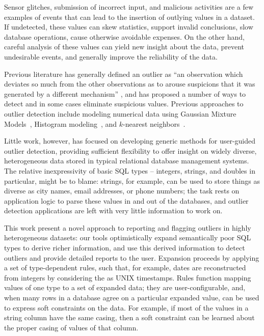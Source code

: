 
Sensor glitches, submission of incorrect input, and malicious activities are a few examples of events that can lead to the insertion of outlying values in a dataset. If undetected, these values can skew statistics, support invalid conclusions, slow database operations, cause otherwise avoidable expenses. On the other hand, careful analysis of these values can yield new insight about the data, prevent undesirable events, and generally improve the reliability of the data.

Previous literature has generally defined an outlier as ``an observation which deviates so much from the other observations as to arouse suspicions that it was generated by a different mechanism'' \cite{Hawkins1980}, and has proposed a number of ways to detect and in some cases eliminate suspicious values. Previous approaches to outlier detection include modeling numerical data using Gaussian Mixture Models~\cite{Lu2005,Roberts1994,Roberts1999}, Histogram modeling~\cite{Gebski2007,Sheng2007}, and $k$-nearest neighbors~\cite{Ramaswamy2000}.

Little work, however, has focused on developing generic methods for user-guided outlier detection, providing sufficient flexibility to offer insight on widely diverse, heterogeneous data stored in typical relational database management systems. The relative inexpressivity of basic SQL types -- integers, strings, and doubles in particular, might be to blame: strings, for example, can be used to store things as diverse as city names, email addresses, or phone numbers; the task rests on application logic to parse these values in and out of the databases, and outlier detection applications are left with very little information to work on.

This work present a novel approach to reporting and flagging outliers in highly heterogeneous datasets: our tools optimistically expand semantically poor SQL types to derive richer information, and use this derived information to detect outliers and provide detailed reports to the user. Expansion proceeds by applying a set of type-dependent rules, such that, for example, dates are reconstructed from integers by considering the as UNIX timestamps. Rules function mapping values of one type to a set of expanded data; they are user-configurable, and, when many rows in a database agree on a particular expanded value, can be used to express soft constraints on the data. For example, if most of the values in a string column have the same casing, then a soft constraint can be learned about the proper casing of values of that column.

